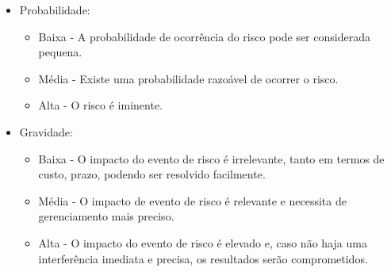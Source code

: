 \documentclass[12pt]{article}
\begin{document}
        \begin{itemize}
            \item  Probabilidade:
            \begin{itemize}
                \item Baixa - A probabilidade de ocorrência do risco pode ser considerada pequena.               
                \item Média - Existe uma probabilidade razoável de ocorrer o risco.
                \item Alta - O risco é iminente.
            \end{itemize}
            \item Gravidade:
            \begin{itemize}
                \item Baixa - O impacto do evento de risco é irrelevante, tanto em termos de custo, prazo, podendo ser resolvido facilmente.
                \item Média - O impacto de evento de risco é relevante e necessita de gerenciamento mais preciso.
                \item Alta - O impacto do evento de risco é elevado e, caso não haja uma interferência imediata e precisa, os resultados serão comprometidos.
            \end{itemize}
        \end{itemize}
       
\end{document}
